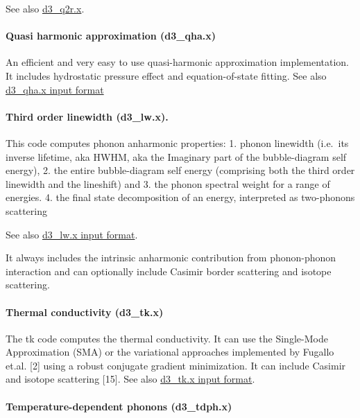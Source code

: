 \documentclass[
]{article}
\begin{document}
See also \protect\hyperlink{d3_r2qx}{d3\_q2r.x}.

\hypertarget{quasi-harmonic-approximation-d3_qha.x}{%
\paragraph{Quasi harmonic approximation
(d3\_qha.x)}\label{quasi-harmonic-approximation-d3_qha.x}}

An efficient and very easy to use quasi-harmonic approximation
implementation. It includes hydrostatic pressure effect and
equation-of-state fitting. See also
\protect\hyperlink{d3_qhax}{d3\_qha.x input format}

\hypertarget{third-order-linewidth-d3_lw.x.}{%
\paragraph{Third order linewidth
(d3\_lw.x).}\label{third-order-linewidth-d3_lw.x.}}

This code computes phonon anharmonic properties: 1. phonon linewidth
(i.e.~its inverse lifetime, aka HWHM, aka the Imaginary part of the
bubble-diagram self energy), 2. the entire bubble-diagram self energy
(comprising both the third order linewidth and the lineshift) and 3. the
phonon spectral weight for a range of energies. 4. the final state
decomposition of an energy, interpreted as two-phonons scattering

See also \protect\hyperlink{d3_lwx}{d3\_lw.x input format}.

It always includes the intrinsic anharmonic contribution from
phonon-phonon interaction and can optionally include Casimir border
scattering and isotope scattering.

\hypertarget{thermal-conductivity-d3_tk.x}{%
\paragraph{Thermal conductivity
(d3\_tk.x)}\label{thermal-conductivity-d3_tk.x}}

The tk code computes the thermal conductivity. It can use the
Single-Mode Approximation (SMA) or the variational approaches
implemented by Fugallo et.al. {[}2{]} using a robust conjugate gradient
minimization. It can include Casimir and isotope scattering {[}15{]}.
See also \protect\hyperlink{d3_tkx}{d3\_tk.x input format}.

\hypertarget{temperature-dependent-phonons-d3_tdph.x}{%
\paragraph{Temperature-dependent phonons
(d3\_tdph.x)}\label{temperature-dependent-phonons-d3_tdph.x}}
\end{document}
